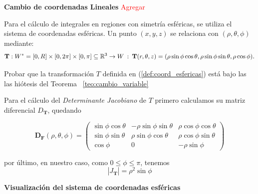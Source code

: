 
\label{sec:coordenadas_esfericas}


\textbf{Cambio de coordenadas Lineales} \textcolor{red}{Agregar}

Para el cálculo de integrales en regiones con simetría esf\'ericas, se utiliza el sistema de coordenadas esf\'ericas. Un punto $(x, y, z)$ se relaciona con $(\rho, \theta ,  \phi)$ mediante:
\begin{equation}\label{def:coord_esfericas}
\mathbf{T}:W^*=[0,R]\times[0, 2\pi]\times[0,\pi]  \subseteq\mathbb{R}^3 \to W\: : \: \mathbf{T}(r, \theta,z ) =( \rho \sin \phi \cos \theta  ,  \rho \sin \phi \sin \theta ,  \rho \cos \phi ).
\end{equation} 

\begin{tarea} Probar que la transformaci\'on $T$ definida en (\ref{def:coord_esfericas}) est\'a bajo las las hi\'otesis del Teorema  ~\ref{teo:cambio_variable}
\end{tarea}


Para el c\'alculo del \emph{Determinante Jacobiano} de $T$  primero  calculamos su  matriz diferencial $D_\mathbf{T}$, quedando
 
\[
    \boldsymbol{D}_{\mathbf{F}}(\rho, \theta, \phi) 
    =
    \begin{pmatrix}
    \sin\phi \cos\theta & -\rho \sin\phi \sin\theta & \rho \cos\phi \cos\theta \\
    \sin\phi \sin\theta & \rho \sin\phi \cos\theta & \rho \cos\phi \sin\theta \\
    \cos\phi & 0 & -\rho \sin\phi
    \end{pmatrix}
    \]
 
 por \'ultimo,  en nuestro caso,  como $  0 \leq \phi \leq \pi$, tenemos
\begin{equation}   \label{ej:jacobiano_esferico}
    \left| J_{\mathbf{T}} \right| = \rho^2 \sin \phi
\end{equation}
  
\textbf{Visualización del sistema de coordenadas esféricas}

\begin{figure}[H]
    \centering
     
    \label{fig:Visualizacion esfericas}
\end{figure}

\vspace{1cm}
